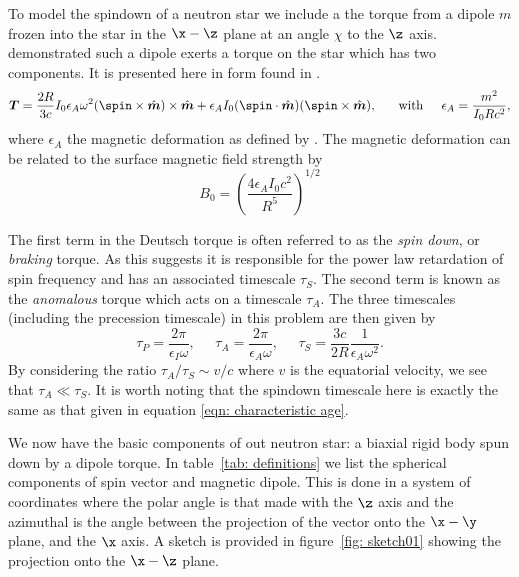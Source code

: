 \documentclass[/home/greg/Thesis/main/main.tex]{subfiles}
\begin{document}
To model the spindown of a neutron star we include a the torque from a dipole
$m$ frozen into the star in the $\x-\z$ plane at an angle $\chi$ to the $\z$
axis. \citet{Deutsch1955} demonstrated such a dipole exerts a torque on the
star which has two components. It is presented here in form found in
\citet{Goldreich1970}.
\begin{equation}
\boldsymbol{T}=\frac{2R}{3c} I_{0}\epsilon_{A}\omega^{2}
               (\spin \times \hat{\boldsymbol{m}})\times \hat{\boldsymbol{m}} 
               + \epsilon_{A}I_{0}(\spin \cdot \hat{\boldsymbol{m}})
               (\spin \times \hat{\boldsymbol{m}}), \;\;\;\;\; \textrm{ with } 
               \;\;\;\; \epsilon_{A} = \frac{m^{2}}{I_{0}R c^{2}},
\label{eqn: torque}
\end{equation}
where $\epsilon_{A}$ the magnetic deformation as defined by \citet{Glampedakis2010}.
The magnetic deformation can be related to the surface magnetic field strength
by 
\begin{equation}
    B_{0} = \left(\frac{4 \epsilon_{A} I_{0} c^{2}}{R^{5}}\right)^{1/2}
    \label{eqn: magnetic field epsA}
\end{equation}

The first term in the Deutsch torque is often referred to as the \emph{spin
down}, or \emph{braking} torque. As this suggests it is responsible for the
power law retardation of spin frequency and has an associated timescale
$\tau_{S}$. The second term is known as the \emph{anomalous} torque which acts
on a timescale $\tau_{A}$. The three timescales (including the precession timescale)
in this problem are then given by
\begin{equation}
\tau_{P}=\frac{2\pi}{\epsilon_{I}\omega},  \;\;\;\;\;
\tau_{A}=\frac{2\pi}{\epsilon_{A}\omega},  \;\;\;\;\; 
\tau_{S}=\frac{3c}{2R}\frac{1}{\epsilon_{A}\omega^{2}}.
\label{eqn: torque timescales}
\end{equation}
By considering the ratio $\tau_{A}/\tau_{S} \sim v/c$ where $v$ is the equatorial
velocity, we see that $\tau_{A} \ll \tau_{S}$. It is worth noting that the
spindown timescale here is exactly the same as that given in equation 
\eqref{eqn: characteristic age}.


We now have the basic components of out neutron star: a biaxial rigid body 
spun down by a dipole torque. In table~\ref{tab: definitions} we list the
spherical components of spin vector and magnetic dipole. This is done in a system
of coordinates where the polar angle is that made with the $\z$ axis and the 
azimuthal is the angle between the projection of the vector onto the $\x-\y$ 
plane, and the $\x$ axis. A sketch is provided in figure~\ref{fig: sketch01}
showing the projection onto the $\x-\z$ plane.
\end{document}
